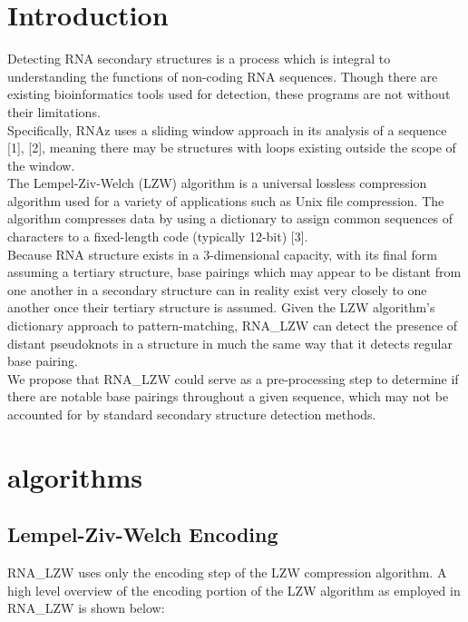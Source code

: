 \documentclass[sigconf]{acmart}
\begin{document}
\section{Introduction}
Detecting RNA secondary structures is a process which is integral to understanding the functions of non-coding RNA sequences. Though there are existing bioinformatics tools used for detection, these programs are not without their limitations. \\
Specifically, RNAz uses a sliding window approach in its analysis of a sequence [1], [2], meaning there may be structures with loops existing outside the scope of the window.\\
The Lempel-Ziv-Welch (LZW) algorithm is a universal lossless compression algorithm used for a variety of applications such as Unix file compression. The algorithm compresses data by using a dictionary to assign common sequences of characters to a fixed-length code (typically 12-bit) [3].\\
Because RNA structure exists in a 3-dimensional capacity, with its final form assuming a tertiary structure, base pairings which may appear to be distant from one another in a secondary structure can in reality exist very closely to one another once their tertiary structure is assumed. Given the LZW algorithm’s dictionary approach to pattern-matching,  RNA\_LZW can detect the presence of distant pseudoknots in a structure in much the same way that it detects regular base pairing. \\
We propose that RNA\_LZW could serve as a pre-processing step to determine if there are notable base pairings throughout a given sequence, which may not be accounted for by standard secondary structure detection methods.

\section{algorithms}


\subsection{Lempel-Ziv-Welch Encoding}

RNA\_LZW uses only the encoding step of the LZW compression algorithm.  A high level overview of the encoding portion of the LZW algorithm as employed in RNA\_LZW is shown below:
\end{document}
